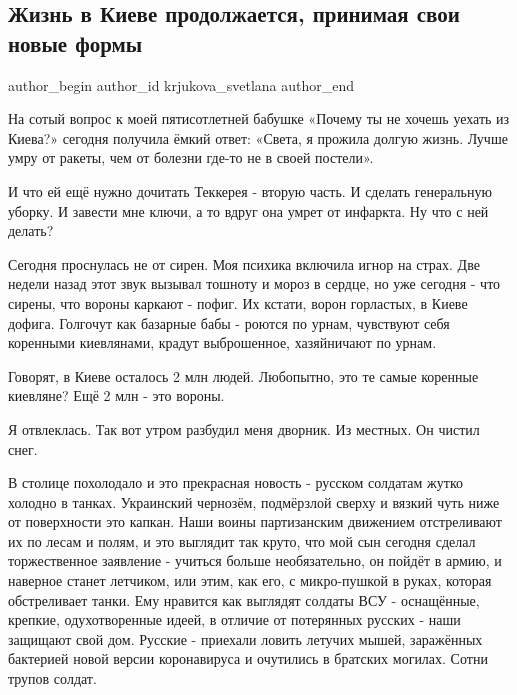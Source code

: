  
 
 
 
 
 
\subsection{Жизнь в Киеве продолжается, принимая свои новые формы}
\label{sec:10_03_2022.tg.krjukova_svetlana.1.zhizn_v_kieve}
 
\ifcmt
 author_begin
   author_id krjukova_svetlana
 author_end
\fi

На сотый вопрос к моей пятисотлетней бабушке «Почему ты не хочешь уехать из
Киева?» сегодня получила ёмкий ответ: «Света, я прожила долгую жизнь. Лучше
умру от ракеты, чем от болезни где-то не в своей постели».

И что ей ещё нужно дочитать Теккерея - вторую часть. И сделать генеральную
уборку. И завести мне ключи, а то вдруг она умрет от инфаркта. Ну что с ней
делать?

Сегодня проснулась не от сирен. Моя психика включила игнор на страх. Две недели
назад этот звук вызывал тошноту и мороз в сердце, но уже сегодня - что сирены,
что вороны каркают - пофиг. Их кстати, ворон горластых, в Киеве дофига.
Голгочут как базарные бабы - роются по урнам, чувствуют себя коренными
киевлянами, крадут выброшенное, хазяйничают по урнам. 

Говорят, в Киеве осталось 2 млн людей. Любопытно, это те самые коренные
киевляне? Ещё 2 млн - это вороны. 

Я отвлеклась. Так вот утром разбудил меня дворник. Из местных. Он чистил снег.

В столице похолодало и это прекрасная новость - русском солдатам жутко холодно
в танках. Украинский чернозём, подмёрзлой сверху и вязкий чуть ниже от
поверхности это капкан. Наши воины партизанским движением отстреливают их по
лесам и полям, и это выглядит так круто, что мой сын сегодня сделал
торжественное заявление - учиться больше необязательно, он пойдёт в армию, и
наверное станет летчиком, или этим, как его, с микро-пушкой в руках, которая
обстреливает танки. Ему нравится как выглядят солдаты ВСУ - оснащённые,
крепкие, одухотворенные идеей, в отличие от потерянных русских - наши защищают
свой дом. Русские - приехали ловить летучих мышей, заражённых бактерией новой
версии коронавируса и очутились в братских могилах. Сотни трупов солдат. 

